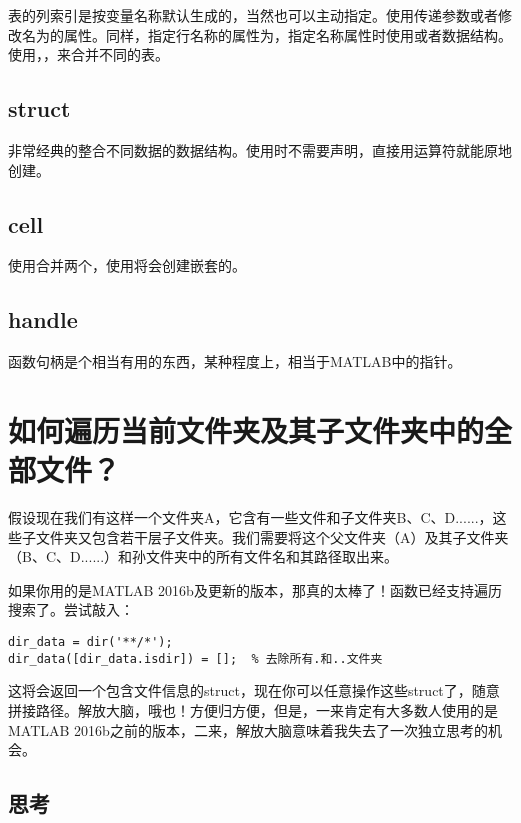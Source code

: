 表的列索引是按变量名称默认生成的，当然也可以主动指定。使用传递参数或者修改名为的属性。同样，指定行名称的属性为，指定名称属性时使用或者数据结构。使用，，来合并不同的表。

\subsection{struct}

非常经典的整合不同数据的数据结构。使用时不需要声明，直接用运算符就能原地创建。

\subsection{cell}

使用\mcode{[{}, {}]}合并两个，使用\mcode{{{}, {}}}将会创建嵌套的。

\subsection{handle}

函数句柄是个相当有用的东西，某种程度上，相当于MATLAB中的指针。

\section{如何遍历当前文件夹及其子文件夹中的全部文件？}

假设现在我们有这样一个文件夹A，它含有一些文件和子文件夹B、C、D......，这些子文件夹又包含若干层子文件夹。我们需要将这个父文件夹（A）及其子文件夹（B、C、D......）和孙文件夹中的所有文件名和其路径取出来。

如果你用的是MATLAB 2016b及更新的版本，那真的太棒了！函数已经支持遍历搜索了。尝试敲入：

\begin{verbatim}
dir_data = dir('**/*');
dir_data([dir_data.isdir]) = [];  % 去除所有.和..文件夹
\end{verbatim}

这将会返回一个包含文件信息的struct，现在你可以任意操作这些struct了，随意拼接路径。解放大脑，哦也！方便归方便，但是，一来肯定有大多数人使用的是MATLAB 2016b之前的版本，二来，解放大脑意味着我失去了一次独立思考的机会。

\subsection*{思考}

